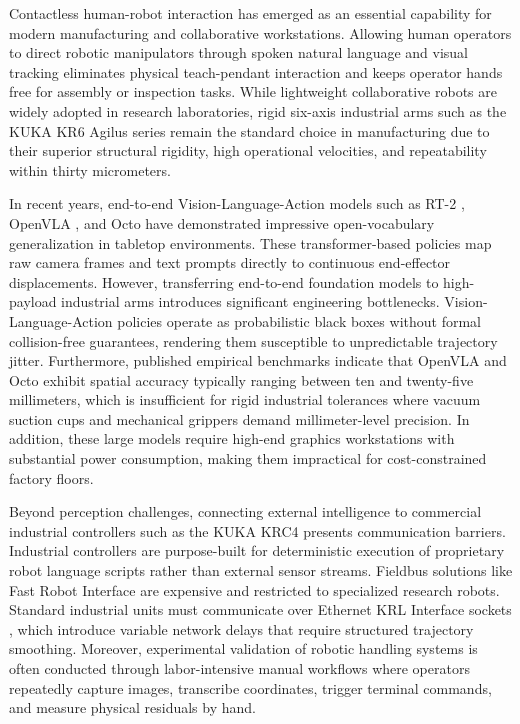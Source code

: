 \documentclass{svproc}
\begin{document}
Contactless human-robot interaction has emerged as an essential capability for modern manufacturing and collaborative workstations. Allowing human operators to direct robotic manipulators through spoken natural language and visual tracking eliminates physical teach-pendant interaction and keeps operator hands free for assembly or inspection tasks. While lightweight collaborative robots are widely adopted in research laboratories, rigid six-axis industrial arms such as the KUKA KR6 Agilus series remain the standard choice in manufacturing due to their superior structural rigidity, high operational velocities, and repeatability within thirty micrometers.

In recent years, end-to-end Vision-Language-Action models such as RT-2 \cite{rt2_2023}, OpenVLA \cite{openvla2024}, and Octo \cite{octo2024} have demonstrated impressive open-vocabulary generalization in tabletop environments. These transformer-based policies map raw camera frames and text prompts directly to continuous end-effector displacements. However, transferring end-to-end foundation models to high-payload industrial arms introduces significant engineering bottlenecks. Vision-Language-Action policies operate as probabilistic black boxes without formal collision-free guarantees, rendering them susceptible to unpredictable trajectory jitter. Furthermore, published empirical benchmarks indicate that OpenVLA \cite{openvla2024} and Octo \cite{octo2024} exhibit spatial accuracy typically ranging between ten and twenty-five millimeters, which is insufficient for rigid industrial tolerances where vacuum suction cups and mechanical grippers demand millimeter-level precision. In addition, these large models require high-end graphics workstations with substantial power consumption, making them impractical for cost-constrained factory floors.

Beyond perception challenges, connecting external intelligence to commercial industrial controllers such as the KUKA KRC4 \cite{kuka_kss2018} presents communication barriers. Industrial controllers are purpose-built for deterministic execution of proprietary robot language scripts rather than external sensor streams. Fieldbus solutions like Fast Robot Interface \cite{lbr_stack2024} are expensive and restricted to specialized research robots. Standard industrial units must communicate over Ethernet KRL Interface sockets \cite{kuka_eki_eval2022}, which introduce variable network delays that require structured trajectory smoothing. Moreover, experimental validation of robotic handling systems is often conducted through labor-intensive manual workflows where operators repeatedly capture images, transcribe coordinates, trigger terminal commands, and measure physical residuals by hand.
\end{document}
